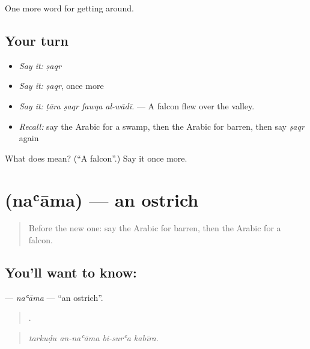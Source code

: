 \begin{grammarlens}[title={What you've built}]
One more word for getting around.
\end{grammarlens}

\subsection*{Your turn}
\begin{itemize}
\raggedright
  \item \emph{Say it:} \emph{ṣaqr}
  \item \emph{Say it:} \emph{ṣaqr}, once more
  \item \emph{Say it:} \emph{ṭāra ṣaqr fawqa al-wādī.} — A falcon flew over the valley.
  \item \emph{Recall:} say the Arabic for a swamp, then the Arabic for barren, then say \emph{ṣaqr} again
\end{itemize}

\begin{tcolorbox}[breakable,colback=teal!4,colframe=teal!35!black,title={Before you move on}]
What does  mean? (\textquotedblleft{}A falcon\textquotedblright{}.) Say it once more.
\end{tcolorbox}
\section[\texorpdfstring{\ar{نعامة} (naʿāma)}{نعامة (naʿāma)}]{ (naʿāma) — an ostrich}

\label{lesson:AR-C474-naama}



\begin{quote}
Before the new one: say the Arabic for barren, then the Arabic for a falcon.
\end{quote}

\subsection*{You'll want to know: }
\textbf{} — \emph{naʿāma} — \textquotedblleft{}an ostrich\textquotedblright{}.

\begin{quote}
   .
\end{quote}

\begin{quote}
\emph{tarkuḍu an-naʿāma bi-surʿa kabīra.}
\end{quote}

